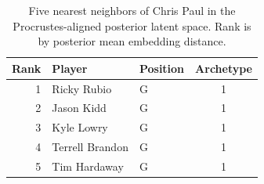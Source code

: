 \begin{table}[htbp]
  \centering\small
  \begin{tabular}{rllc}
    \toprule
    Rank & Player & Position & Archetype \\
    \midrule
    1 & Ricky Rubio & G & 1 \\
    2 & Jason Kidd & G & 1 \\
    3 & Kyle Lowry & G & 1 \\
    4 & Terrell Brandon & G & 1 \\
    5 & Tim Hardaway & G & 1 \\
    \bottomrule
  \end{tabular}
  \caption{Five nearest neighbors of Chris Paul in the Procrustes-aligned posterior latent space. Rank is by posterior mean embedding distance.}
  \label{tab:Chris_Paul_neighbors}
\end{table}

